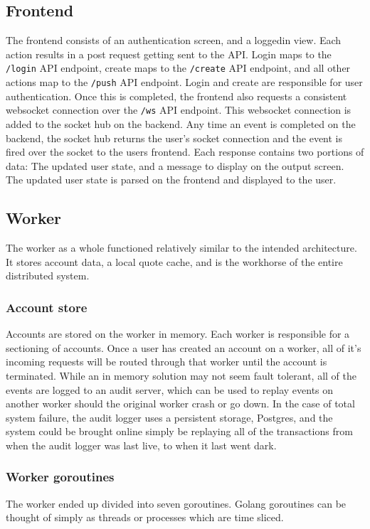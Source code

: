 \subsection{Frontend}
The frontend consists of an authentication screen, and a loggedin view. Each action results in a post request getting sent to the API. Login maps to the \texttt{/login} API endpoint, create maps to the \texttt{/create} API endpoint, and all other actions map to the \texttt{/push} API endpoint. Login and create are responsible for user authentication. Once this is completed, the frontend also requests a consistent websocket connection over the \texttt{/ws} API endpoint. This websocket connection is added to the socket hub on the backend. Any time an event is completed on the backend, the socket hub returns the user’s socket connection and the event is fired over the socket to the users frontend. Each response contains two portions of data: The updated user state, and a message to display on the output screen. The updated user state is parsed on the frontend and displayed to the user.

\subsection{Worker}
The worker as a whole functioned relatively similar to the intended architecture. It stores account data, a local quote cache, and is the workhorse of the entire distributed system.

\subsubsection{Account store}
Accounts are stored on the worker in memory. Each worker is responsible for a sectioning of accounts. Once a user has created an account on a worker, all of it’s incoming requests will be routed through that worker until the account is terminated. While an in memory solution may not seem fault tolerant, all of the events are logged to an audit server, which can be used to replay events on another worker should the original worker crash or go down. In the case of total system failure, the audit logger uses a persistent storage, Postgres, and the system could be brought online simply be replaying all of the transactions from when the audit logger was last live, to when it last went dark.

\subsubsection{Worker goroutines}
The worker ended up divided into seven goroutines. Golang goroutines can be thought of simply as threads or processes which are time sliced.

